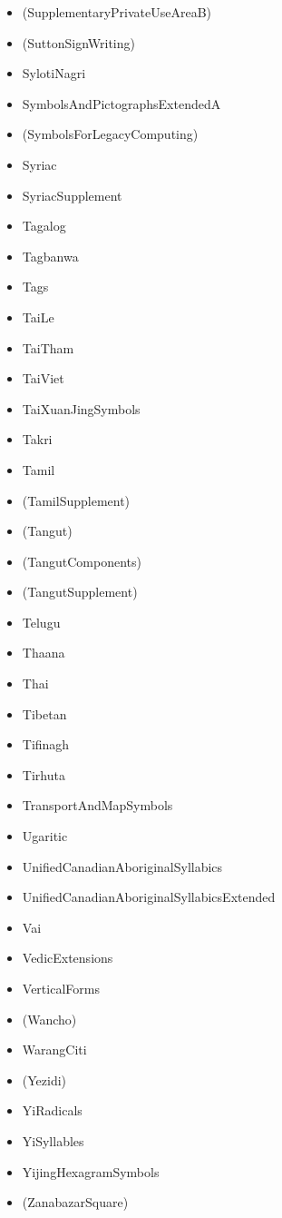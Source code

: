 \documentclass{article}
\newenvironment{itemlist}{%
  \begin{itemize}
  \setlength{\itemsep}{0pt}
  \setlength{\parsep}{0pt}
  \setlength{\topsep}{0pt}
  \setlength{\partopsep}{0pt}
  \setlength{\parskip}{0pt}
  \setlength{\labelsep}{5pt}}%
{
  \end{itemize}}
\begin{document}
\begin{multicols*}{2}
\begin{itemlist}
        \item (SupplementaryPrivateUseAreaB)
        \item (SuttonSignWriting)
        \item SylotiNagri
        \item SymbolsAndPictographsExtendedA
        \item (SymbolsForLegacyComputing)
        \item Syriac
        \item SyriacSupplement
        \item Tagalog
        \item Tagbanwa
        \item Tags
        \item TaiLe
        \item TaiTham
        \item TaiViet
        \item TaiXuanJingSymbols
        \item Takri
        \item Tamil
        \item (TamilSupplement)
        \item (Tangut)
        \item (TangutComponents)
        \item (TangutSupplement)
        \item Telugu
        \item Thaana
        \item Thai
        \item Tibetan
        \item Tifinagh
        \item Tirhuta
        \item TransportAndMapSymbols
        \item Ugaritic
        \item UnifiedCanadianAboriginalSyllabics
        \item UnifiedCanadianAboriginalSyllabicsExtended
        \item Vai
        \item VedicExtensions
        \item VerticalForms
        \item (Wancho)
        \item WarangCiti
        \item (Yezidi)
        \item YiRadicals
        \item YiSyllables
        \item YijingHexagramSymbols
        \item (ZanabazarSquare)
      \end{itemlist}
    \end{multicols*}
\end{document}
